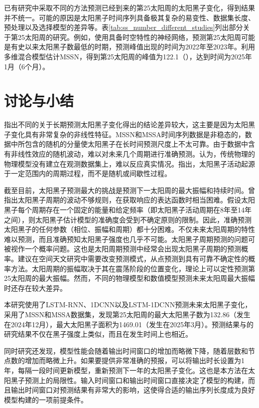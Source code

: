 已有研究中采取不同的方法预测已经到来的第25太阳周的太阳黑子变化，得到结果并不统一。可能的原因是太阳黑子时间序列具备极其复杂的易变性、数据集长度、预处理以及选择模型的差异等。表\ref{tab:ss_number_different_studies}列出部分关于第25太阳周的研究。例如，\citet{covas2019neural}使用具备时空特性的神经网络，预测第25太阳周可能是有史以来太阳黑子数最低的时期，预测峰值出现的时间为2022年至2023年。\citet{okoh2018hybrid}利用多维混合模型估计MSSN，得到第25太阳周的峰值为122.1（），达到时间为2025年1月（\pm 6个月）。

\section{讨论与小结}\label{sec:ss_conclusion}

\citet{solanki2011analyzing}指出不同的关于长期预测太阳黑子变化得出的结论差异较大，这主要是因为太阳黑子变化具有非常复杂的非线性特征。MSSN和MSSA时间序列数据是非稳态的，数据中所包含的随机的分量使太阳黑子在长时间预测尺度上不太可靠。由于数据中含有非线性效应的随机波动，难以对未来几个周期进行准确预测\citep{charbonneau2010dynamo,petrovay2010solar}。\citet{charbonneau2010dynamo}认为，传统物理的物理模型没有建立在观测数据集上，难以反应真实情况。\citet{mendoza2011mid}指出，太阳黑子活动起源于一定范围内的周期过程，而不是随机或间歇性过程。

截至目前，太阳黑子预测最大的挑战是预测下一太阳周的最大振幅和持续时间\citep{petrovay2010solar}。\citet{gleissberg1939long}曾指出太阳黑子周期的波动不够规则，在获取响应的表达函数时相当困难。\citet{herrera2015reconstruction}假设太阳黑子每个周期存在一个固定的能量和给定频率（即太阳黑子活动周期在8年至14年之间），则太阳黑子估计模型的准确度会受到不确定原则的限制。因此，准确预测太阳黑子的任何参数（相位、振幅和周期）都十分困难。不仅未来太阳周期的特性难以预测，而且准确预知太阳黑子强度也几乎不可能。太阳黑子周期预测的问题可被视作一个概率问题。这也是太阳周期预测中经常会出现太阳黑子周期的预测概率。\citet{camporeale2019challenge}建议在空间天文研究中需要改变预测模式，从点预测到具有可靠不确定性的概率方法。太阳周期的振幅取决于其在震荡阶段的位置变化，理论上可以定性预测第25太阳周的最大振幅。然而，不同的物理模型和数值模型预测未来太阳周最大振幅时还存在较大差异。

本研究使用了LSTM-RNN、1DCNN以及LSTM-1DCNN预测未来太阳黑子变化，采用了MSSN和MSSA数据集，发现第25太阳周的最大太阳黑子数为132.86（发生在2024年12月），最大太阳黑子面积为1469.01（发生在2025年3月）。预测结果与\citet{covas2019neural}的研究结果不仅在黑子强度上类似，而且在发生时间上也相近。

同时研究还发现，模型性能会随着输出时间窗口的增加而略微下降，随着层数和节点数的增加而略微上升。如果要提供非常准确的预报，可以将输出时长设置为1年，每隔一段时间更新模型，重新预测下一年的太阳黑子变化。这也是本方法在太阳黑子预测上的局限性。输入时间窗口和输出时间窗口直接决定了模型的构建，而且输出时间窗口对预测结果有非常大的影响，这使得合适的输出序列长度成为良好模型构建的一项前提条件。
